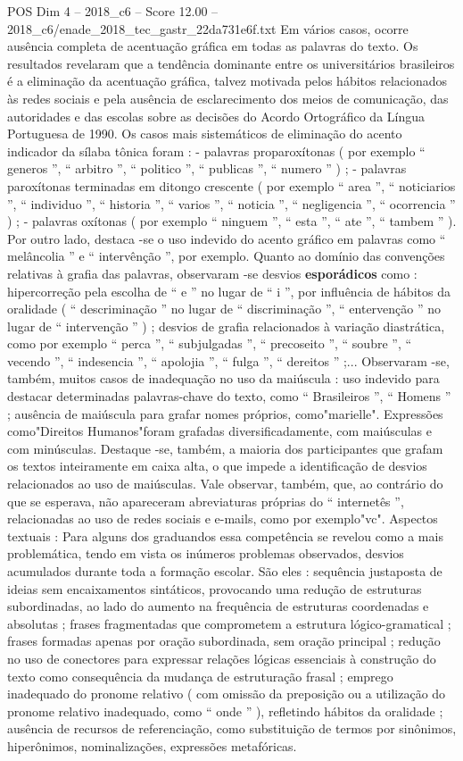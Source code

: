\begin{textsample}{POS Dim 4 – 2018\_c6 – Score 12.00 – 2018\_c6/enade\_2018\_tec\_gastr\_22da731e6f.txt}
Em vários casos, ocorre ausência completa de acentuação gráfica em todas as palavras do texto.
Os resultados revelaram que a tendência dominante entre os universitários brasileiros é a eliminação da acentuação gráfica, talvez motivada pelos hábitos relacionados às redes sociais e pela ausência de esclarecimento dos meios de comunicação, das autoridades e das escolas sobre as decisões do Acordo Ortográfico da Língua Portuguesa de 1990.
Os casos mais sistemáticos de eliminação do acento indicador da sílaba tônica foram : - palavras proparoxítonas ( por exemplo “ generos ”, “ arbitro ”, “ politico ”, “ publicas ”, “ numero ” ) ; - palavras paroxítonas terminadas em ditongo crescente ( por exemplo “ area ”, “ noticiarios ”, “ individuo ”, “ historia ”, “ varios ”, “ noticia ”, “ negligencia ”, “ ocorrencia ” ) ; - palavras oxítonas ( por exemplo “ ninguem ”, “ esta ”, “ ate ”, “ tambem ” ).
Por outro lado, destaca -se o uso indevido do acento gráfico em palavras como “ melâncolia ” e “ intervênção ”, por exemplo.
Quanto ao domínio das convenções relativas à grafia das palavras, observaram -se desvios \textbf{esporádicos} como : hipercorreção pela escolha de “ e ” no lugar de “ i ”, por influência de hábitos da oralidade ( “ descriminação ” no lugar de “ discriminação ”, “ entervenção ” no lugar de “ intervenção ” ) ; desvios de grafia relacionados à variação diastrática, como por exemplo “ perca ”, “ subjulgadas ”, “ precoseito ”, “ soubre ”, “ vecendo ”, “ indesencia ”, “ apolojia ”, “ fulga ”, “ dereitos ” ;...
Observaram -se, também, muitos casos de inadequação no uso da maiúscula : uso indevido para destacar determinadas palavras-chave do texto, como “ Brasileiros ”, “ Homens ” ; ausência de maiúscula para grafar nomes próprios, como"marielle".
Expressões como"Direitos Humanos"foram grafadas diversificadamente, com maiúsculas e com minúsculas.
Destaque -se, também, a maioria dos participantes que grafam os textos inteiramente em caixa alta, o que impede a identificação de desvios relacionados ao uso de maiúsculas.
Vale observar, também, que, ao contrário do que se esperava, não apareceram abreviaturas próprias do “ internetês ”, relacionadas ao uso de redes sociais e e-mails, como por exemplo"vc".
Aspectos textuais : Para alguns dos graduandos essa competência se revelou como a mais problemática, tendo em vista os inúmeros problemas observados, desvios acumulados durante toda a formação escolar.
São eles : sequência justaposta de ideias sem encaixamentos sintáticos, provocando uma redução de estruturas subordinadas, ao lado do aumento na frequência de estruturas coordenadas e absolutas ; frases fragmentadas que comprometem a estrutura lógico-gramatical ; frases formadas apenas por oração subordinada, sem oração principal ; redução no uso de conectores para expressar relações lógicas essenciais à construção do texto como consequência da mudança de estruturação frasal ; emprego inadequado do pronome relativo ( com omissão da preposição ou a utilização do pronome relativo inadequado, como “ onde ” ), refletindo hábitos da oralidade ; ausência de recursos de referenciação, como substituição de termos por sinônimos, hiperônimos, nominalizações, expressões metafóricas.

\end{textsample}
